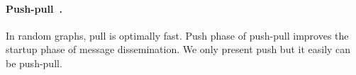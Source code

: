 \paragraph{Push-pull~\cite{mercier2017optimal}.} In random graphs, pull is
optimally fast. Push phase of push-pull improves the startup phase of message
dissemination. We only present push but it easily can be push-pull. 



